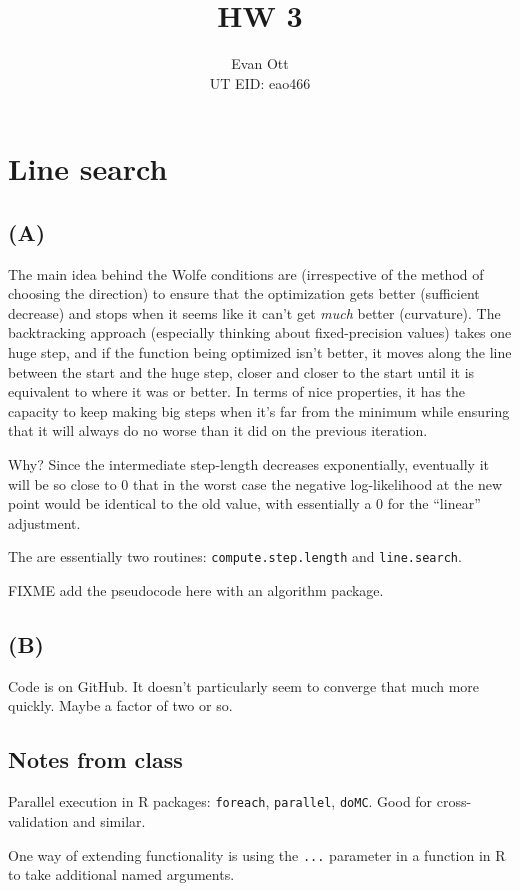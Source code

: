 \documentclass{article}
\title{\vspace{-6ex}HW 3\vspace{-2ex}}
\author{Evan Ott \\ UT EID: eao466\vspace{-2ex}}
\begin{document}
\maketitle
\section{Line search}
\subsection{(A)}
The main idea behind the Wolfe conditions are (irrespective of the method of choosing the direction) to ensure
that the optimization gets better (sufficient decrease) and stops when it seems like it can't get \emph{much} better
(curvature). The backtracking approach (especially thinking about fixed-precision values) takes one huge step, and if
the function being optimized isn't better, it moves along the line between the start and the huge step, closer and closer to the start until it is equivalent to where it was or better. In terms of nice properties, it has the capacity to keep making
big steps when it's far from the minimum while ensuring that it will always do no worse than it did on the previous iteration.

Why? Since the intermediate step-length decreases exponentially, eventually it will be so close to 0 that in the worst case
the negative log-likelihood at the new point would be identical to the old value, with essentially a 0 for the ``linear'' adjustment.

The are essentially two routines: \texttt{compute.step.length} and \texttt{line.search}.

{\Large{FIXME} add the pseudocode here with an algorithm package.}

\subsection{(B)}
Code is on GitHub. It doesn't particularly seem to converge that much more quickly. Maybe a factor of two or so.

\subsection{Notes from class}
Parallel execution in R packages: \texttt{foreach}, \texttt{parallel}, \texttt{doMC}. Good for cross-validation and similar.

One way of extending functionality is using the \texttt{...} parameter in a function in R to take additional named arguments.
\end{document}
